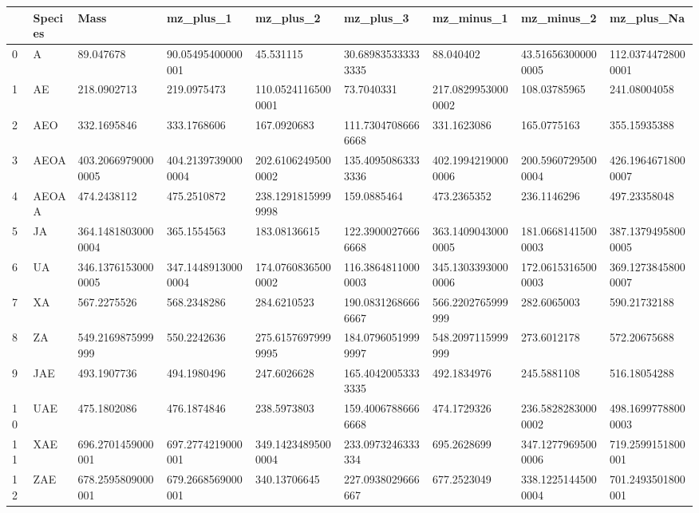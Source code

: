 {\tiny
\begin{longtable}{|l|l|l|l|l|l|l|l|l|}
    \hline
        ~ & Species & Mass & mz\_plus\_1 & mz\_plus\_2 & mz\_plus\_3 & mz\_minus\_1 & mz\_minus\_2 & mz\_plus\_Na \\ \hline
        0 & A & 89.047678 & 90.05495400000001 & 45.531115 & 30.689835333333335 & 88.040402 & 43.516563000000005 & 112.03744728000001 \\ \hline
        1 & AE & 218.0902713 & 219.0975473 & 110.05241165000001 & 73.7040331 & 217.08299530000002 & 108.03785965 & 241.08004058 \\ \hline
        2 & AEO & 332.1695846 & 333.1768606 & 167.0920683 & 111.73047086666668 & 331.1623086 & 165.0775163 & 355.15935388 \\ \hline
        3 & AEOA & 403.20669790000005 & 404.21397390000004 & 202.61062495000002 & 135.40950863333336 & 402.19942190000006 & 200.59607295000004 & 426.19646718000007 \\ \hline
        4 & AEOAA & 474.2438112 & 475.2510872 & 238.12918159999998 & 159.0885464 & 473.2365352 & 236.1146296 & 497.23358048 \\ \hline
        5 & JA & 364.14818030000004 & 365.1554563 & 183.08136615 & 122.39000276666668 & 363.14090430000005 & 181.06681415000003 & 387.13794958000005 \\ \hline
        6 & UA & 346.13761530000005 & 347.14489130000004 & 174.07608365000002 & 116.38648110000003 & 345.13033930000006 & 172.06153165000003 & 369.12738458000007 \\ \hline
        7 & XA & 567.2275526 & 568.2348286 & 284.6210523 & 190.08312686666667 & 566.2202765999999 & 282.6065003 & 590.21732188 \\ \hline
        8 & ZA & 549.2169875999999 & 550.2242636 & 275.61576979999995 & 184.07960519999997 & 548.2097115999999 & 273.6012178 & 572.20675688 \\ \hline
        9 & JAE & 493.1907736 & 494.1980496 & 247.6026628 & 165.40420053333335 & 492.1834976 & 245.5881108 & 516.18054288 \\ \hline
        10 & UAE & 475.1802086 & 476.1874846 & 238.5973803 & 159.40067886666668 & 474.1729326 & 236.58282830000002 & 498.16997788000003 \\ \hline
        11 & XAE & 696.2701459000001 & 697.2774219000001 & 349.14234895000004 & 233.0973246333334 & 695.2628699 & 347.12779695000006 & 719.2599151800001 \\ \hline
        12 & ZAE & 678.2595809000001 & 679.2668569000001 & 340.13706645 & 227.0938029666667 & 677.2523049 & 338.12251445000004 & 701.2493501800001 \\ \hline

\end{longtable}}
